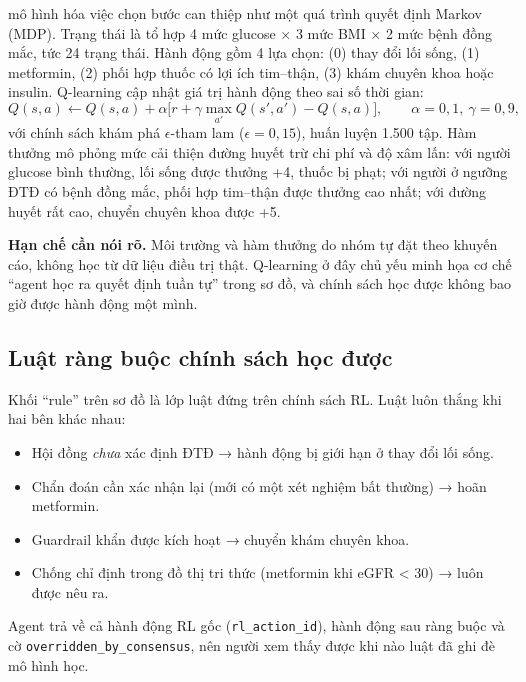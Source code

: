  mô hình hóa việc chọn bước can thiệp như một quá trình quyết định Markov (MDP). Trạng thái là tổ hợp 4 mức glucose × 3 mức BMI × 2 mức bệnh đồng mắc, tức 24 trạng thái. Hành động gồm 4 lựa chọn: (0) thay đổi lối sống, (1) metformin, (2) phối hợp thuốc có lợi ích tim–thận, (3) khám chuyên khoa hoặc insulin. Q-learning \cite{watkins1992,sutton2018} cập nhật giá trị hành động theo sai số thời gian:
\begin{equation}
Q(s,a) \leftarrow Q(s,a) + \alpha\big[r + \gamma\max_{a'}Q(s',a') - Q(s,a)\big],\qquad \alpha=0{,}1,\ \gamma=0{,}9,
\label{eq:qlearn}
\end{equation}
với chính sách khám phá $\epsilon$-tham lam ($\epsilon=0{,}15$), huấn luyện 1.500 tập. Hàm thưởng mô phỏng mức cải thiện đường huyết trừ chi phí và độ xâm lấn: với người glucose bình thường, lối sống được thưởng +4, thuốc bị phạt; với người ở ngưỡng ĐTĐ có bệnh đồng mắc, phối hợp tim–thận được thưởng cao nhất; với đường huyết rất cao, chuyển chuyên khoa được +5.

\textbf{Hạn chế cần nói rõ.} Môi trường và hàm thưởng do nhóm tự đặt theo khuyến cáo, không học từ dữ liệu điều trị thật. Q-learning ở đây chủ yếu minh họa cơ chế ``agent học ra quyết định tuần tự'' trong sơ đồ, và chính sách học được không bao giờ được hành động một mình.

\subsection{Luật ràng buộc chính sách học được}

Khối ``rule'' trên sơ đồ là lớp luật đứng trên chính sách RL. Luật luôn thắng khi hai bên khác nhau:
\begin{itemize}
  \item Hội đồng \emph{chưa} xác định ĐTĐ → hành động bị giới hạn ở thay đổi lối sống.
  \item Chẩn đoán cần xác nhận lại (mới có một xét nghiệm bất thường) → hoãn metformin.
  \item Guardrail khẩn được kích hoạt → chuyển khám chuyên khoa.
  \item Chống chỉ định trong đồ thị tri thức (metformin khi eGFR < 30) → luôn được nêu ra.
\end{itemize}
Agent trả về cả hành động RL gốc (\texttt{rl\_action\_id}), hành động sau ràng buộc và cờ \texttt{overridden\_by\_consensus}, nên người xem thấy được khi nào luật đã ghi đè mô hình học.

